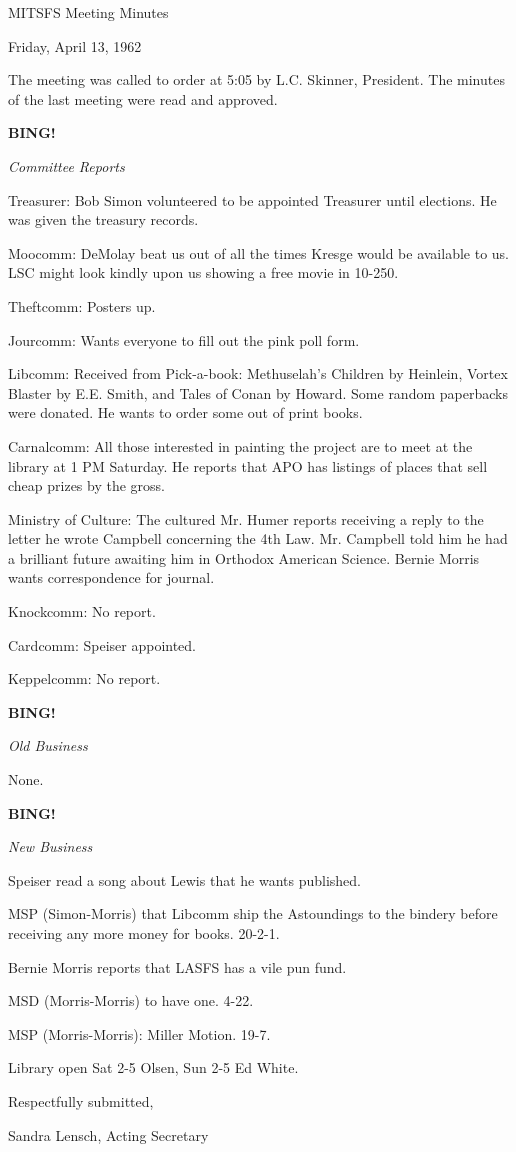 \documentclass[12pt]{article}
\newcommand{\bing}{{\bf BING!} }
\newcommand{\goto}[1]{\bing \vskip 12pt \centerline{{\em{#1}}}}
\begin{document}
\begin{center}

MITSFS Meeting Minutes

Friday, April 13, 1962

\end{center}
 
\vspace{12pt}

\setlength{\parskip}{6pt}

\noindent
The meeting was called to order at 5:05 by L.C. Skinner, President. The minutes of the last meeting were read and approved.

\goto{Committee Reports}

Treasurer: Bob Simon volunteered to be appointed Treasurer until elections. He was given the treasury records.

Moocomm: DeMolay beat us out of all the times Kresge would be available to us. LSC might look kindly upon us showing a free movie in 10-250.

Theftcomm: Posters up.

Jourcomm: Wants everyone to fill out the pink poll form.

Libcomm: Received from Pick-a-book: Methuselah's Children by Heinlein, Vortex Blaster by E.E. Smith, and Tales of Conan by Howard. Some random paperbacks were donated. He wants to order some out of print books.

Carnalcomm: All those interested in painting the project are to meet at the library at 1 PM Saturday. He reports that APO has listings of places that sell cheap prizes by the gross.

Ministry of Culture: The cultured Mr. Humer reports receiving a reply to the letter he wrote Campbell concerning the 4th Law. Mr. Campbell told him he had a brilliant future awaiting him in Orthodox American Science. Bernie Morris wants correspondence for journal.

Knockcomm: No report.

Cardcomm: Speiser appointed.

Keppelcomm: No report.

\goto{Old Business}

None.

\goto{New Business}

Speiser read a song about Lewis that he wants published.

MSP (Simon-Morris) that Libcomm ship the Astoundings to the bindery before receiving any more money for books. 20-2-1.

Bernie Morris reports that LASFS has a vile pun fund.

MSD (Morris-Morris) to have one. 4-22.

MSP (Morris-Morris): Miller Motion. 19-7.

Library open Sat 2-5 Olsen, Sun 2-5 Ed White.

\vspace{12pt}

\centerline{Respectfully submitted,}
\centerline{Sandra Lensch, Acting Secretary}
\end{document}
